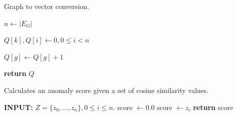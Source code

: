 
%
%
%
%
%
%
%


\begin{algorithm}[h!]  
\caption{Graph to vector conversion.} 
 \label{graph_to_vector} 
\begin{algorithmic}[1]


\State $n \gets |E_G|$

\State $Q[k],Q[i] \gets 0, 0 \leq i < n$




\State $Q[g] \gets Q[g] + 1$
\EndIf

\EndFor

\EndFor


\State \textbf{return} $Q$

\EndProcedure

\end{algorithmic}
\end{algorithm}

\begin{algorithm}[h!] 
\caption{Calculates an anomaly score given a set of cosine similarity values.}  
 \label{alg:min_func} 
\begin{algorithmic}[1]  

\State \textbf{INPUT: } $Z=\{z_0,...,z_n\} , 0 \leq i \leq n.$
\State score $\gets 0.0$
\State score $\gets z_i$
\EndIf
\EndFor	
\State \textbf{return} score
\EndProcedure

\end{algorithmic}
\end{algorithm}


